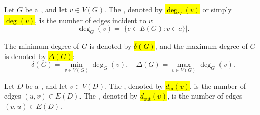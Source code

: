 \begin{definition} \label{definition:degree_of_a_vertex_in_a_graph}
Let $G$ be a , and let $v \in V(G)$. The , denoted by \hl{$\deg_G(v)$} or simply \hl{$\deg(v)$}, is the number of edges incident to $v$:
$$\deg_G(v) = |\{e \in E(G) : v \in e\}|.$$

The minimum degree of $G$ is denoted by \hl{$\delta(G)$}, and the maximum degree of $G$ is denoted by \hl{$\Delta(G)$}:
$$\delta(G) = \min_{v \in V(G)} \deg_G(v), \quad \Delta(G) = \max_{v \in V(G)} \deg_G(v).$$

Let $D$ be a , and let $v \in V(D)$. The , denoted by \hl{$d_{\operatorname{in}}(v)$}, is the number of edges $(u,v) \in E(D)$. The , denoted by \hl{$d_{\operatorname{out}}(v)$}, is the number of edges $(v,u) \in E(D)$.
\end{definition}
